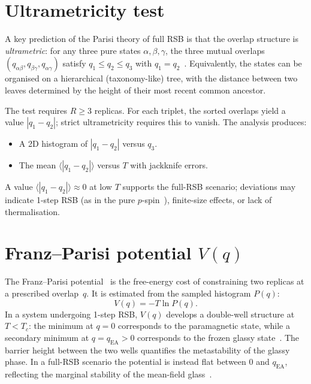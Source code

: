 \documentclass[11pt,a4paper]{article}
\newcommand{\avg}[1]{\langle #1 \rangle}
\begin{document}
\section{Ultrametricity test}

A key prediction of the Parisi theory of full RSB is that the
overlap structure is \emph{ultrametric}: for any three pure states
$\alpha,\beta,\gamma$, the three mutual overlaps $(q_{\alpha\beta},
q_{\beta\gamma}, q_{\alpha\gamma})$ satisfy $q_1 \le q_2 \le q_3$
with $q_1 = q_2$~\cite{Parisi1983,MPV1987,Rammal1986}.
Equivalently, the states can be organised on a hierarchical
(taxonomy-like) tree, with the distance between two leaves
determined by the height of their most recent common ancestor.

The test requires $R \ge 3$ replicas.  For each triplet, the
sorted overlaps yield a value $|q_1 - q_2|$; strict ultrametricity
requires this to vanish.  The analysis produces:
\begin{itemize}[nosep]
  \item A 2D histogram of $|q_1 - q_2|$ versus $q_3$.
  \item The mean $\avg{|q_1 - q_2|}$ versus $T$ with jackknife
    errors.
\end{itemize}
A value $\avg{|q_1 - q_2|} \approx 0$ at low $T$ supports the
full-RSB scenario; deviations may indicate 1-step RSB (as in
the pure $p$-spin~\cite{CrisantiSommers1992}),
finite-size effects, or lack of thermalisation.

\section{Franz--Parisi potential $V(q)$}

The Franz--Parisi potential~\cite{FranzParisi1995} is the
free-energy cost of constraining two replicas at a prescribed
overlap~$q$.  It is estimated from the sampled histogram $P(q)$:
\begin{equation}
  V(q) = -T\ln P(q).
\end{equation}
In a system undergoing 1-step RSB, $V(q)$ develops a double-well
structure at $T < T_c$: the minimum at $q=0$ corresponds to the
paramagnetic state, while a secondary minimum at
$q = q_{\mathrm{EA}} > 0$ corresponds to the
frozen glassy state~\cite{FranzParisi1995,MPV1987}.
The barrier height between the two wells quantifies the
metastability of the glassy phase.
In a full-RSB scenario the potential is instead flat between
$0$ and $q_{\mathrm{EA}}$, reflecting the marginal stability
of the mean-field glass~\cite{MPV1987,Parisi1983}.
\end{document}
